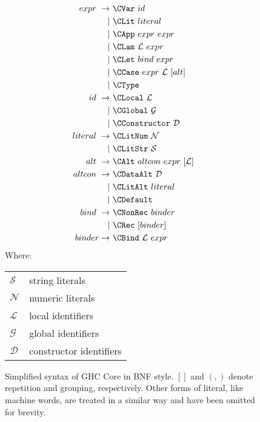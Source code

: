 \begin{figure}
  \begin{equation*}
    \begin{split}
      expr\    \rightarrow\ & \CVar\ id                          \\
                         |\ & \CLit\ literal                     \\
                         |\ & \CApp\ expr\ expr                  \\
                         |\ & \CLam\ \mathcal{L}\ expr           \\
                         |\ & \CLet\ bind\ expr                  \\
                         |\ & \CCase\ expr\ \mathcal{L}\ [alt]   \\
                         |\ & \CType                             \\
      id\      \rightarrow\ & \CLocal\       \mathcal{L}         \\
                         |\ & \CGlobal\      \mathcal{G}         \\
                         |\ & \CConstructor\ \mathcal{D}         \\
      literal\ \rightarrow\ & \CLitNum\ \mathcal{N}              \\
                         |\ & \CLitStr\ \mathcal{S}              \\
      alt\     \rightarrow\ & \CAlt\ altcon\ expr\ [\mathcal{L}] \\
      altcon\  \rightarrow\ & \CDataAlt\ \mathcal{D}             \\
                         |\ & \CLitAlt\ literal                  \\
                         |\ & \CDefault                          \\
      bind\    \rightarrow\ & \CNonRec\ binder                   \\
                         |\ & \CRec\ [binder]                    \\
      binder   \rightarrow\ & \CBind\ \mathcal{L}\ expr
    \end{split}
  \end{equation*}
  Where:
  \begin{tabular}[t]{l @{ $=$ } l}
    $\mathcal{S}$ & string literals    \\
    $\mathcal{N}$ & numeric literals   \\
    $\mathcal{L}$ & local identifiers  \\
    $\mathcal{G}$ & global identifiers \\
    $\mathcal{D}$ & constructor identifiers
  \end{tabular}

  \caption{Simplified syntax of GHC Core in BNF style. $[]$ and $(,)$ denote
    repetition and grouping, respectively. Other forms of literal, like machine
    words, are treated in a similar way and have been omitted for brevity.}
  \label{fig:coresyntax}
\end{figure}

